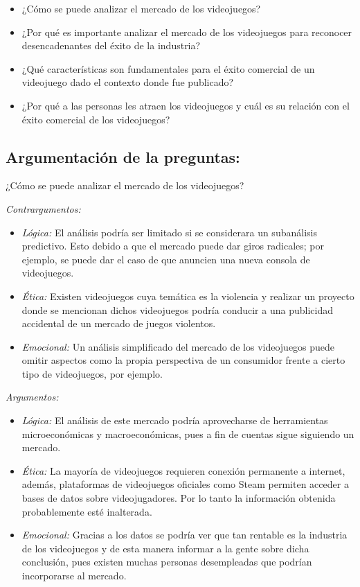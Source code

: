 \documentclass[
  letterpaper,
  DIV=11,
  numbers=noendperiod]{scrreprt}
\begin{document}
\begin{itemize}
\item
  ¿Cómo se puede analizar el mercado de los videojuegos?
\item
  ¿Por qué es importante analizar el mercado de los videojuegos para
  reconocer desencadenantes del éxito de la industria?
\item
  ¿Qué características son fundamentales para el éxito comercial de un
  videojuego dado el contexto donde fue publicado?
\item
  ¿Por qué a las personas les atraen los videojuegos y cuál es su
  relación con el éxito comercial de los videojuegos?
\end{itemize}

\subsection{Argumentación de la
preguntas:}\label{argumentaciuxf3n-de-la-preguntas}

¿Cómo se puede analizar el mercado de los videojuegos?

\emph{Contrargumentos:}

\begin{itemize}
\item
  \emph{Lógica:} El análisis podría ser limitado si se considerara un
  subanálisis predictivo. Esto debido a que el mercado puede dar giros
  radicales; por ejemplo, se puede dar el caso de que anuncien una nueva
  consola de videojuegos.
\item
  \emph{Ética:} Existen videojuegos cuya temática es la violencia y
  realizar un proyecto donde se mencionan dichos videojuegos podría
  conducir a una publicidad accidental de un mercado de juegos
  violentos.
\item
  \emph{Emocional:} Un análisis simplificado del mercado de los
  videojuegos puede omitir aspectos como la propia perspectiva de un
  consumidor frente a cierto tipo de videojuegos, por ejemplo.
\end{itemize}

\emph{Argumentos:}

\begin{itemize}
\item
  \emph{Lógica:} El análisis de este mercado podría aprovecharse de
  herramientas microeconómicas y macroeconómicas, pues a fin de cuentas
  sigue siguiendo un mercado.
\item
  \emph{Ética:} La mayoría de videojuegos requieren conexión permanente
  a internet, además, plataformas de videojuegos oficiales como Steam
  permiten acceder a bases de datos sobre videojugadores. Por lo tanto
  la información obtenida probablemente esté inalterada.
\item
  \emph{Emocional:} Gracias a los datos se podría ver que tan rentable
  es la industria de los videojuegos y de esta manera informar a la
  gente sobre dicha conclusión, pues existen muchas personas
  desempleadas que podrían incorporarse al mercado.
\end{itemize}
\end{document}
